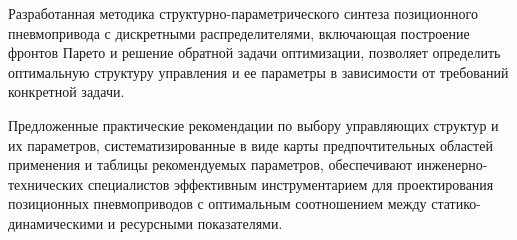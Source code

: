 Разработанная методика структурно-параметрического синтеза позиционного пневмопривода с дискретными
распределителями, включающая построение фронтов Парето и решение обратной задачи оптимизации,
позволяет определить оптимальную структуру управления и ее параметры в зависимости от требований конкретной задачи.

Предложенные практические рекомендации по выбору управляющих структур и их параметров,
систематизированные в виде карты предпочтительных областей применения и таблицы рекомендуемых
параметров, обеспечивают инженерно-технических специалистов эффективным инструментарием для
проектирования позиционных пневмоприводов с оптимальным соотношением между статико-динамическими и ресурсными показателями.